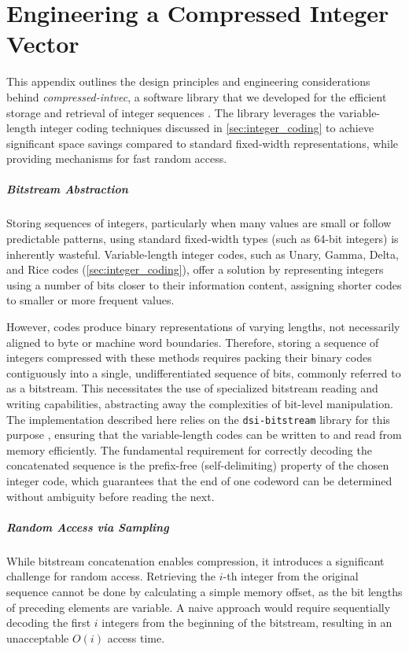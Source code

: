 \chapter{Engineering a Compressed Integer Vector}
\label{app:compressed_intvec_engineering}

\noindent This appendix outlines the design principles and engineering considerations behind \emph{compressed-intvec}, a software library that we developed for the efficient storage and retrieval of integer sequences \cite{compressed-intvec}. The library leverages the variable-length integer coding techniques discussed in \autoref{sec:integer_coding} to achieve significant space savings compared to standard fixed-width representations, while providing mechanisms for fast random access.

\paragraph{Bitstream Abstraction}
Storing sequences of integers, particularly when many values are small or follow predictable patterns, using standard fixed-width types (such as 64-bit integers) is inherently wasteful. Variable-length integer codes, such as Unary, Gamma, Delta, and Rice codes (\autoref{sec:integer_coding}), offer a solution by representing integers using a number of bits closer to their information content, assigning shorter codes to smaller or more frequent values.

However, codes produce binary representations of varying lengths, not necessarily aligned to byte or machine word boundaries. Therefore, storing a sequence of integers compressed with these methods requires packing their binary codes contiguously into a single, undifferentiated sequence of bits, commonly referred to as a bitstream. This necessitates the use of specialized bitstream reading and writing capabilities, abstracting away the complexities of bit-level manipulation. The implementation described here relies on the \texttt{dsi-bitstream} library for this purpose \cite{dsi-bitstream}, ensuring that the variable-length codes can be written to and read from memory efficiently. The fundamental requirement for correctly decoding the concatenated sequence is the prefix-free (self-delimiting) property of the chosen integer code, which guarantees that the end of one codeword can be determined without ambiguity before reading the next.

\paragraph{Random Access via Sampling}
While bitstream concatenation enables compression, it introduces a significant challenge for random access. Retrieving the $i$-th integer from the original sequence cannot be done by calculating a simple memory offset, as the bit lengths of preceding elements are variable. A naive approach would require sequentially decoding the first $i$ integers from the beginning of the bitstream, resulting in an unacceptable $O(i)$ access time.

